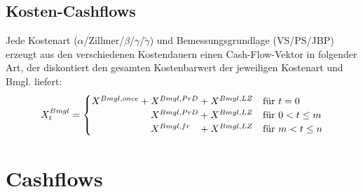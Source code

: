 \documentclass[a4paper,10pt]{article}
\begin{document}
\subsection{Kosten-Cashflows}
Jede Kostenart ($\alpha$/Zillmer/$\beta$/$\gamma$/$\tilde{\gamma}$) und Bemessungsgrundlage (VS/{}PS/{}JBP) erzeugt aus den verschiedenen Kostendauern einen Cash-Flow-Vektor in folgender Art, der diskontiert den gesamten Kostenbarwert der jeweiligen Kostenart und Bmgl. liefert:
\begin{equation*}
 X_t^{Bmgl} = 
 \begin{cases}
 X^{Bmgl,once} + X^{Bmgl,PrD} + X^{Bmgl,LZ} & \text{für $t=0$} \\
 \hphantom{X^{Bmgl,once} + \;\,} X^{Bmgl,PrD} + X^{Bmgl,LZ} & \text{für $0<t\leq m$} \\
 \hphantom{X^{Bmgl,once} + \;\,} X^{Bmgl,fr} \;\;\; + X^{Bmgl,LZ} & \text{für $m<t\leq n$}
 \end{cases}
\end{equation*}




\pagebreak

\section{Cashflows}
\end{document}
